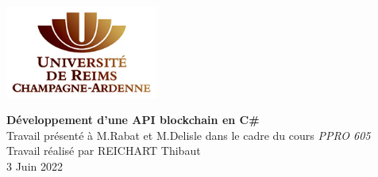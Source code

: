 \documentclass[11pt]{article}		            %
\theoremstyle{definition}                       %
\begin{document}
\thispagestyle{empty}	                        %
\begin{center}
    \includegraphics[width=5cm]{image/logo.jpg}	    %
\end{center}
\vspace{4cm}	                                %
\begin{center}	                                %
    {\huge \bf Développement d'une API blockchain en C\# }\\                        %
    \vspace{3cm}
    \large Travail présenté à M.Rabat et M.Delisle dans le cadre du cours \emph{PPRO 605} \\
    \vspace{3cm}
    Travail réalisé par REICHART Thibaut\\
    \vfill	                                    %
    3 Juin 2022
\end{center}
\newpage
\end{document}
